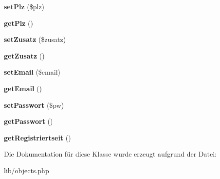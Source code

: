 \begin{DoxyCompactItemize}
\item 
\hypertarget{classKunde_ac77b9f03709bac5d0fdf51af6c5d9506}{{\bfseries set\-Plz} (\$plz)}\label{classKunde_ac77b9f03709bac5d0fdf51af6c5d9506}

\item 
\hypertarget{classKunde_a9fba8370e41ff890f87a95d4d467e684}{{\bfseries get\-Plz} ()}\label{classKunde_a9fba8370e41ff890f87a95d4d467e684}

\item 
\hypertarget{classKunde_a46ef3694829f44f131e5c13b6e82b808}{{\bfseries set\-Zusatz} (\$zusatz)}\label{classKunde_a46ef3694829f44f131e5c13b6e82b808}

\item 
\hypertarget{classKunde_a90e98d3440a64d9883e78dc93a469e66}{{\bfseries get\-Zusatz} ()}\label{classKunde_a90e98d3440a64d9883e78dc93a469e66}

\item 
\hypertarget{classKunde_a750f29ac8456a1de5844423795f2f3bc}{{\bfseries set\-Email} (\$email)}\label{classKunde_a750f29ac8456a1de5844423795f2f3bc}

\item 
\hypertarget{classKunde_af880094791a185aafe1556c1b19c3e0e}{{\bfseries get\-Email} ()}\label{classKunde_af880094791a185aafe1556c1b19c3e0e}

\item 
\hypertarget{classKunde_acf257c68e9212322ba4e66f753c5da24}{{\bfseries set\-Passwort} (\$pw)}\label{classKunde_acf257c68e9212322ba4e66f753c5da24}

\item 
\hypertarget{classKunde_a271f13f3690fb10213d08c5365700ae1}{{\bfseries get\-Passwort} ()}\label{classKunde_a271f13f3690fb10213d08c5365700ae1}

\item 
\hypertarget{classKunde_af99f38bcde53d559fc99c59fbc55eaa1}{{\bfseries get\-Registriertseit} ()}\label{classKunde_af99f38bcde53d559fc99c59fbc55eaa1}

\end{DoxyCompactItemize}


\-Die \-Dokumentation für diese \-Klasse wurde erzeugt aufgrund der \-Datei\-:\begin{DoxyCompactItemize}
\item 
lib/objects.\-php\end{DoxyCompactItemize}
